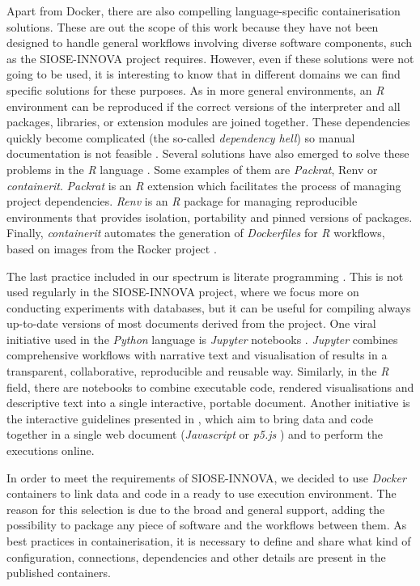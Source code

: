 \documentclass[ijgi,article,submit,moreauthors,pdftex]{Definitions/mdpi}
\begin{document}
Apart from Docker, there are also compelling language-specific containerisation solutions. These are out the scope of this work because they have not been designed to handle general workflows involving diverse software components, such as the SIOSE-INNOVA project requires. However, even if these solutions were not going to be used, it is interesting to know that in different domains we can find specific solutions for these purposes. As in more general environments, an \textit{R} environment can be reproduced if the correct versions of the interpreter and all packages, libraries, or extension modules are joined together. These dependencies quickly become complicated (the so-called \textit{dependency hell}) so manual documentation is not feasible \cite{nust2017opening}. Several solutions have also emerged to solve these problems in the \textit{R} language \cite{nust2017opening}. Some examples of them are \textit{Packrat}, Renv or \emph{containerit}. \textit{Packrat} is an \textit{R} extension \cite{packrat} which facilitates the process of managing project dependencies. \textit{Renv} \cite{renv} is an \textit{R} package for managing reproducible environments that provides isolation, portability and pinned versions of packages. Finally, \emph{containerit} \cite{nust2019containerit} automates the generation of \textit{Dockerfiles} for \textit{R} workflows, based on images from the Rocker project \cite{boettiger2017introduction}. 

The last practice included in our spectrum is literate programming \cite{knuth1984literate}. This is not used regularly in the SIOSE-INNOVA project, where we focus more on conducting experiments with databases, but it can be useful for compiling always up-to-date versions of most documents derived from the project. One viral initiative used in the \textit{Python} language is \textit{Jupyter} notebooks \cite{kluyver2016jupyter}. \textit{Jupyter} combines comprehensive workflows with narrative text and visualisation of results in a transparent, collaborative, reproducible and reusable way. Similarly, in the \textit{R} field, there are notebooks \cite{hillebrand2015mastering} to combine executable code, rendered visualisations and descriptive text into a single interactive, portable document. Another initiative is the interactive guidelines presented in \cite{trillesSubmitted}, which aim to bring data and code together in a single web document (\textit{Javascript} or \textit{p5.js} \cite{p5js}) and to perform the executions online. 

In order to meet the requirements of SIOSE-INNOVA, we decided to use \textit{Docker} containers to link data and code in a ready to use execution environment. The reason for this selection is due to the broad and general support, adding the possibility to package any piece of software and the workflows between them. As best practices in containerisation, it is necessary to define and share what kind of configuration, connections, dependencies and other details are present in the published containers.
\end{document}
